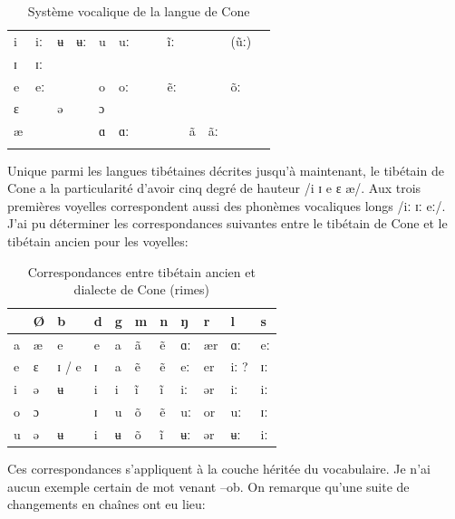 \documentclass[oldfontcommands,oneside,a4paper,11pt]{memoir}
\newcommand{\ipa}[1]{{\phon #1}} %
\begin{document}
\begin{table}[H]
\caption{Système vocalique de la langue de Cone}\label{tab:cone1}
\begin{tabular}{lllllllllllll} 
\toprule
i  &  	iː  &  	ʉ  &  	ʉː  &  	u  &  	uː  &  	   &  	   &  	ĩː  &  	   &  	   &  	(ũː)  &  \\
ɪ  &  	ɪː  &  	   &  	   &  	   &  	   &  	   &  	   &  	   &  	   &  	   &  	   &  \\
e  &  	eː  &  	   &  	   &  	o  &  	oː  &  	   &  	   &  	ẽː  &  	   &  	   &  	õː  &  \\
ɛ  &  	   &  	ə  &  	   &  	ɔ  &  	   &  	   &  	   &  	   &  	   &  	   &  	   &  \\
æ  &  	   &  	   &  	   &  	ɑ  &  	ɑː  &  	   &  	   &  	   &  	ã  &  	ãː  &  	   &  \\
  &  	  &  	  &  	  &  	  &  	  &  	  &  	  &  	  &  	  &  	  &  	  &  \\
\bottomrule
\end{tabular}
\end{table}
Unique parmi les langues tibétaines décrites jusqu'à maintenant, le tibétain de Cone a la particularité d'avoir cinq degré de hauteur /i ɪ e ɛ æ/. Aux trois premières voyelles correspondent aussi des  phonèmes vocaliques longs /iː ɪː eː/. J'ai pu déterminer les correspondances suivantes entre le tibétain de Cone et le tibétain ancien pour les voyelles:
\begin{table}[H]
\caption{Correspondances entre tibétain ancien et dialecte de Cone (rimes)}\label{tab:cone} \centering
\begin{tabular}{l|llllllllll} 
\toprule
   &  	Ø  &  	b  &  	d  &  	g  &  	m  &  	n  &  	ŋ  &  	r  &  	l  &  	s  \\
\midrule
a  &  	æ  &  	e  &  	e  &  	a  &  	ã  &  	ẽ  &  	ɑː  &  	ær  &  	ɑː  &  	eː   \\
e  &  	ɛ  &  	ɪ / e  &  	ɪ  &  	a  &  	ẽ  &  	ẽ  &  	eː  &  	er  &  	iː ?  &  	ɪː   \\
i  &  	ə  &  	ʉ  &  	i  &  	i  &  	ĩ  &  	ĩ  &  	iː  &  	ər  &  	iː  &  	iː   \\
o  &  	ɔ  &  	   &  	ɪ  &  	u  &  	õ  &  	ẽ  &  	uː  &  	or  &  	uː  &  	ɪː   \\
u  &  	ə  &  	ʉ  &  	i  &  	ʉ  &  	õ  &  	ĩ  &  	ʉː  &  	ər  &  	ʉː  &  	iː   \\ 
\bottomrule
\end{tabular}
\end{table}
Ces correspondances s'appliquent à la couche héritée du vocabulaire. Je n'ai aucun exemple certain de mot venant --\ipa{ob}. On remarque qu'une suite de changements en chaînes ont eu lieu: 
\end{document}
